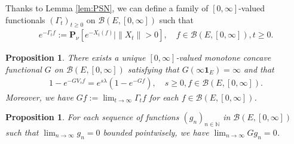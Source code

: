 \documentclass[12pt,a4paper]{amsart}
\numberwithin{equation}{section}
\theoremstyle{plain}
\newtheorem{prop}[thm]{Proposition}
\theoremstyle{definition}
\theoremstyle{remark}
\begin{document}
Thanks to Lemma \ref{lem:PSN}, we can define a family of $[0,\infty]$-valued functionals $(\Gamma_t)_{t\geq 0}$ on $\mathcal B(E, [0,\infty])$ such that
\begin{align} \label{::Y-1}
  e^{-\Gamma_t f}
  := \mathbf P_{\nu}[e^{- X_t(f)}| \|X_t\| > 0], 
  \quad f\in \mathcal B(E,[0,\infty]), t \geq 0.
\end{align}

\begin{prop} \label{::YG}
  There exists a unique $[0,\infty]$-valued monotone concave functional $G$ on $\mathcal B(E,[0,\infty])$ satisfying that $G(\infty \mathbf 1_E) = \infty$ and that
  \begin{align}
    \label{eq:MY5}
    1 - e^{- G V_sf} = e^{s\lambda} (1- e^{- G f}),
    \quad s \geq 0, f \in \mathcal B(E, [0,\infty]).
  \end{align}
  Moreover, we have $ Gf := \lim_{t\to \infty} \Gamma_tf$ for each $f\in \mathcal B(E,[0,\infty])$.
\end{prop}

\begin{prop} \label{::YZ}
For each sequence of functions $(g_{n})_{n\in \mathbb N}$ in $\mathcal B(E, [0,\infty])$ such that $\lim_{n \to \infty} g_n = 0$ bounded pointwisely, we have $\lim_{n \to \infty} G g_n = 0$.
\end{prop}
\end{document}
